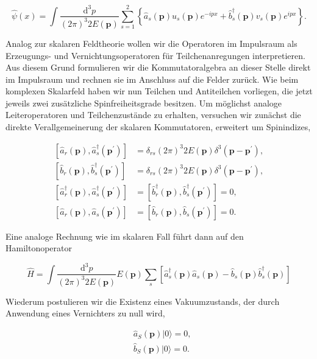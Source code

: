 \documentclass[10pt, letterpaper]{article}
\begin{document}
$$
\hat{\psi}(x)=\int \frac{\mathrm{d}^{3} p}{(2 \pi)^{3} 2 E(\mathbf{p})} \sum_{s=1}^{2}\left\{\hat{a}_{s}(\mathbf{p}) u_{s}(\mathbf{p}) e^{-i p x}+\hat{b}_{s}^{\dagger}(\mathbf{p}) v_{s}(\mathbf{p}) e^{i p x}\right\} .
$$

Analog zur skalaren Feldtheorie wollen wir die Operatoren im Impulsraum als Erzeugungs- und Vernichtungsoperatoren für Teilchenanregungen interpretieren. Aus diesem Grund formulieren wir die Kommutatoralgebra an dieser Stelle direkt im Impulsraum und rechnen sie im Anschluss auf die Felder zurück. Wie beim komplexen Skalarfeld haben wir nun Teilchen und Antiteilchen vorliegen, die jetzt jeweils zwei zusätzliche Spinfreiheitsgrade besitzen. Um möglichst analoge Leiteroperatoren und Teilchenzustände zu erhalten, versuchen wir zunächst die direkte Verallgemeinerung der skalaren Kommutatoren, erweitert um Spinindizes,

$$
\begin{aligned}
{\left[\hat{a}_{r}(\mathbf{p}), \hat{a}_{s}^{\dagger}\left(\mathbf{p}^{\prime}\right)\right] } & =\delta_{r s}(2 \pi)^{3} 2 E(\mathbf{p}) \delta^{3}\left(\mathbf{p}-\mathbf{p}^{\prime}\right), \\
{\left[\hat{b}_{r}(\mathbf{p}), \hat{b}_{s}^{\dagger}\left(\mathbf{p}^{\prime}\right)\right] } & =\delta_{r s}(2 \pi)^{3} 2 E(\mathbf{p}) \delta^{3}\left(\mathbf{p}-\mathbf{p}^{\prime}\right), \\
{\left[\hat{a}_{r}^{\dagger}(\mathbf{p}), \hat{a}_{s}^{\dagger}\left(\mathbf{p}^{\prime}\right)\right] } & =\left[\hat{b}_{r}^{\dagger}(\mathbf{p}), \hat{b}_{s}^{\dagger}\left(\mathbf{p}^{\prime}\right)\right]=0, \\
{\left[\hat{a}_{r}(\mathbf{p}), \hat{a}_{s}\left(\mathbf{p}^{\prime}\right)\right] } & =\left[\hat{b}_{r}(\mathbf{p}), \hat{b}_{s}\left(\mathbf{p}^{\prime}\right)\right]=0 .
\end{aligned}
$$

Eine analoge Rechnung wie im skalaren Fall führt dann auf den Hamiltonoperator

$$
\hat{H}=\int \frac{\mathrm{d}^{3} p}{(2 \pi)^{3} 2 E(\mathbf{p})} E(\mathbf{p}) \sum_{s}\left[\hat{a}_{s}^{\dagger}(\mathbf{p}) \hat{a}_{s}(\mathbf{p})-\hat{b}_{s}(\mathbf{p}) \hat{b}_{s}^{\dagger}(\mathbf{p})\right]
$$

Wiederum postulieren wir die Existenz eines Vakuumzustands, der durch Anwendung eines Vernichters zu null wird,

$$
\begin{aligned}
& \hat{a}_{S}(\mathbf{p})|0\rangle=0, \\
& \hat{b}_{S}(\mathbf{p})|0\rangle=0 .
\end{aligned}
$$
\end{document}
